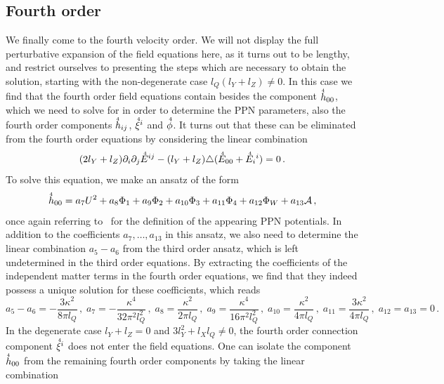 \documentclass[notitlepage,a4paper,aps,prd,onecolumn,superscriptaddress,nofootinbib,groupedaddress,longbibliography]{revtex4-2}
\newcommand{\order}[2]{\accentset{#2}{#1}}
\begin{document}
\subsection{Fourth order}\label{ssec:order4}
We finally come to the fourth velocity order. We will not display the full perturbative expansion of the field equations here, as it turns out to be lengthy, and restrict ourselves to presenting the steps which are necessary to obtain the solution, starting with the non-degenerate case \(l_Q(l_Y + l_Z) \neq 0\). In this case we find that the fourth order field equations contain besides the component \(\order{h}{4}_{00}\), which we need to solve for in order to determine the PPN parameters, also the fourth order components \(\order{h}{4}_{ij}\), \(\order{\xi}{4}^i\) and \(\order{\phi}{4}\). It turns out that these can be eliminated from the fourth order equations by considering the linear combination
\begin{equation}
(2l_Y + l_Z)\partial_i\partial_j\order{E}{4}^{ij} - (l_Y + l_Z)\triangle(\order{E}{4}_{00} + \order{E}{4}_i{}^i) = 0\,.
\end{equation}
To solve this equation, we make an ansatz of the form
\begin{equation}\label{eqn:metans4}
\order{h}{4}_{00} = a_7U^2 + a_8\Phi_1 + a_9\Phi_2 + a_{10}\Phi_3 + a_{11}\Phi_4 + a_{12}\Phi_W + a_{13}\mathcal{A}\,,
\end{equation}
once again referring to~\cite{Will:1993ns} for the definition of the appearing PPN potentials. In addition to the coefficients \(a_7, \ldots, a_{13}\) in this ansatz, we also need to determine the linear combination \(a_5 - a_6\) from the third order ansatz, which is left undetermined in the third order equations. By extracting the coefficients of the independent matter terms in the fourth order equations, we find that they indeed possess a unique solution for these coefficients, which reads
\begin{equation}\label{eqn:coeff4nondeg}
a_5 - a_6 = -\frac{3\kappa^2}{8\pi l_Q}\,, \;
a_7 = -\frac{\kappa^4}{32\pi^2l_Q^2}\,, \;
a_8 = \frac{\kappa^2}{2\pi l_Q}\,, \;
a_9 = \frac{\kappa^4}{16\pi^2l_Q^2}\,, \;
a_{10} =  \frac{\kappa^2}{4\pi l_Q}\,, \;
a_{11} =  \frac{3\kappa^2}{4\pi l_Q}\,, \;
a_{12} = a_{13} = 0\,.
\end{equation}
In the degenerate case \(l_Y + l_Z = 0\) and \(3l_Y^2 + l_Xl_Q \neq 0\), the fourth order connection component \(\order{\xi}{4}^i\) does not enter the field equations. One can isolate the component \(\order{h}{4}_{00}\) from the remaining fourth order components by taking the linear combination
\end{document}
